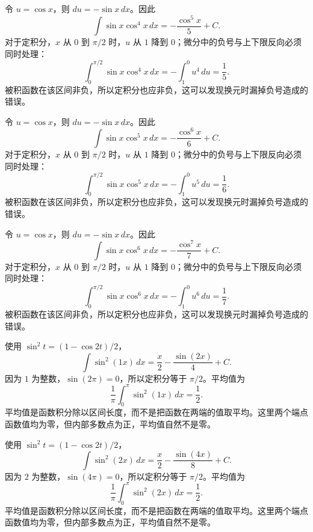 \documentclass[12pt,fontset=fandol]{ctexart}
\begin{document}
\begin{solve}\label{ans:c14q4}
令 $u=\cos x$，则 $du=-\sin x\,dx$。因此
\[
\int\sin x\cos^{4}x\,dx=-\frac{\cos^{5}x}{5}+C.
\]
对于定积分，$x$ 从 $0$ 到 $\pi/2$ 时，$u$ 从 $1$ 降到 $0$；微分中的负号与上下限反向必须同时处理：
\[
\int_0^{\pi/2}\sin x\cos^{4}x\,dx=-\int_1^0u^{4}\,du=\frac{1}{5}.
\]
被积函数在该区间非负，所以定积分也应非负，这可以发现换元时漏掉负号造成的错误。
\end{solve}

\begin{solve}\label{ans:c14q5}
令 $u=\cos x$，则 $du=-\sin x\,dx$。因此
\[
\int\sin x\cos^{5}x\,dx=-\frac{\cos^{6}x}{6}+C.
\]
对于定积分，$x$ 从 $0$ 到 $\pi/2$ 时，$u$ 从 $1$ 降到 $0$；微分中的负号与上下限反向必须同时处理：
\[
\int_0^{\pi/2}\sin x\cos^{5}x\,dx=-\int_1^0u^{5}\,du=\frac{1}{6}.
\]
被积函数在该区间非负，所以定积分也应非负，这可以发现换元时漏掉负号造成的错误。
\end{solve}

\begin{solve}\label{ans:c14q6}
令 $u=\cos x$，则 $du=-\sin x\,dx$。因此
\[
\int\sin x\cos^{6}x\,dx=-\frac{\cos^{7}x}{7}+C.
\]
对于定积分，$x$ 从 $0$ 到 $\pi/2$ 时，$u$ 从 $1$ 降到 $0$；微分中的负号与上下限反向必须同时处理：
\[
\int_0^{\pi/2}\sin x\cos^{6}x\,dx=-\int_1^0u^{6}\,du=\frac{1}{7}.
\]
被积函数在该区间非负，所以定积分也应非负，这可以发现换元时漏掉负号造成的错误。
\end{solve}

\begin{solve}\label{ans:c14q7}
使用 $\sin^2t=(1-\cos2t)/2$，
\[
\int\sin^2(1x)\,dx=\frac x2-\frac{\sin(2x)}{4}+C.
\]
因为 $1$ 为整数，$\sin(2\pi)=0$，所以定积分等于 $\pi/2$。平均值为
\[
\frac1\pi\int_0^\pi\sin^2(1x)\,dx=\frac12.
\]
平均值是函数积分除以区间长度，而不是把函数在两端的值取平均。这里两个端点函数值均为零，但内部多数点为正，平均值自然不是零。
\end{solve}

\begin{solve}\label{ans:c14q8}
使用 $\sin^2t=(1-\cos2t)/2$，
\[
\int\sin^2(2x)\,dx=\frac x2-\frac{\sin(4x)}{8}+C.
\]
因为 $2$ 为整数，$\sin(4\pi)=0$，所以定积分等于 $\pi/2$。平均值为
\[
\frac1\pi\int_0^\pi\sin^2(2x)\,dx=\frac12.
\]
平均值是函数积分除以区间长度，而不是把函数在两端的值取平均。这里两个端点函数值均为零，但内部多数点为正，平均值自然不是零。
\end{solve}
\end{document}
